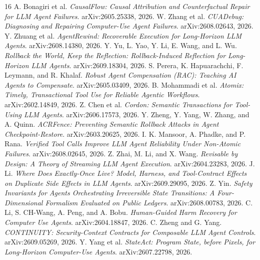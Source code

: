 \documentclass[10pt]{article}
\begin{document}
\begin{thebibliography}{16}
 A. Bonagiri et al. \emph{CausalFlow: Causal Attribution and Counterfactual Repair for LLM Agent Failures}. arXiv:2605.25338, 2026.
 W. Zhang et al. \emph{CUADebug: Diagnosing and Repairing Computer-Use Agent Failures}. arXiv:2608.02643, 2026.
 Y. Zhuang et al. \emph{AgentRewind: Recoverable Execution for Long-Horizon LLM Agents}. arXiv:2608.14380, 2026.
 Y. Yu, L. Yao, Y. Li, E. Wang, and L. Wu. \emph{Rollback the World, Keep the Reflection: Rollback-Induced Reflection for Long-Horizon LLM Agents}. arXiv:2609.18304, 2026.
 S. Perera, K. Hapuarachchi, F. Leymann, and R. Khalaf. \emph{Robust Agent Compensation (RAC): Teaching AI Agents to Compensate}. arXiv:2605.03409, 2026.
 B. Mohammadi et al. \emph{Atomix: Timely, Transactional Tool Use for Reliable Agentic Workflows}. arXiv:2602.14849, 2026.
 Z. Chen et al. \emph{Cordon: Semantic Transactions for Tool-Using LLM Agents}. arXiv:2606.17573, 2026.
 Y. Zheng, Y. Yang, W. Zhang, and A. Quinn. \emph{ACRFence: Preventing Semantic Rollback Attacks in Agent Checkpoint-Restore}. arXiv:2603.20625, 2026.
 I. K. Mansoor, A. Phadke, and P. Rana. \emph{Verified Tool Calls Improve LLM Agent Reliability Under Non-Atomic Failures}. arXiv:2608.02645, 2026.
 Z. Zhai, M. Li, and X. Wang. \emph{Revisable by Design: A Theory of Streaming LLM Agent Execution}. arXiv:2604.23283, 2026.
 J. Li. \emph{Where Does Exactly-Once Live? Model, Harness, and Tool-Contract Effects on Duplicate Side Effects in LLM Agents}. arXiv:2609.29095, 2026.
 Z. Yin. \emph{Safety Invariants for Agents Orchestrating Irreversible State Transitions: A Four-Dimensional Formalism Evaluated on Public Ledgers}. arXiv:2608.00783, 2026.
 C. Li, S. CH-Wang, A. Peng, and A. Bobu. \emph{Human-Guided Harm Recovery for Computer Use Agents}. arXiv:2604.18847, 2026.
 C. Zheng and G. Yang. \emph{CONTINUITY: Security-Context Contracts for Composable LLM Agent Controls}. arXiv:2609.05269, 2026.
 Y. Yang et al. \emph{StateAct: Program State, before Pixels, for Long-Horizon Computer-Use Agents}. arXiv:2607.22798, 2026.
\end{thebibliography}
\end{document}
